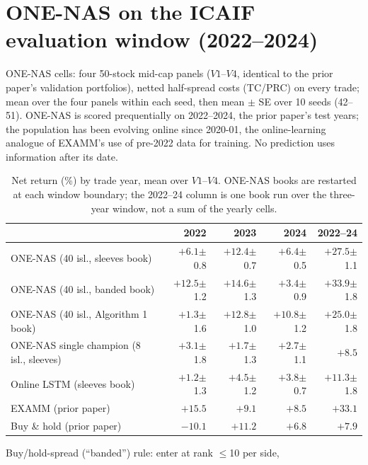 \documentclass[11pt]{article}
\newcommand{\se}[1]{{\scriptsize$\pm$#1}}
\begin{document}
\section*{ONE-NAS on the ICAIF evaluation window (2022--2024)}

ONE-NAS cells: four 50-stock mid-cap panels ($V1$--$V4$, identical to the
prior paper's validation portfolios), netted half-spread costs (TC/PRC) on
every trade; mean over the four panels within each seed, then mean $\pm$ SE
over 10 seeds (42--51). ONE-NAS is scored prequentially on 2022--2024, the
prior paper's test years; the population has been evolving online since
2020-01, the online-learning analogue of EXAMM's use of pre-2022 data for
training. No prediction uses information after its date.

\begin{table}[h]
\centering
\begin{threeparttable}
\caption{Net return (\%) by trade year, mean over $V1$--$V4$. ONE-NAS books
are restarted at each window boundary; the 2022--24 column is one book run
over the three-year window, not a sum of the yearly cells.}
\begin{tabular}{lrrrr}
\toprule
 & 2022 & 2023 & 2024 & 2022--24 \\
\midrule
ONE-NAS (40 isl., sleeves book)              & $+6.1$\se{0.8}  & $+12.4$\se{0.7} & $+6.4$\se{0.5}  & $+27.5$\se{1.1} \\
ONE-NAS (40 isl., banded book)\tnote{a}      & $+12.5$\se{1.2} & $+14.6$\se{1.3} & $+3.4$\se{0.9}  & $+33.9$\se{1.8} \\
ONE-NAS (40 isl., Algorithm 1 book)\tnote{b} & $+1.3$\se{1.6}  & $+12.8$\se{1.0} & $+10.8$\se{1.2} & $+25.0$\se{1.8} \\
\midrule
ONE-NAS single champion (8 isl., sleeves)\tnote{d} & $+3.1$\se{1.8} & $+1.7$\se{1.3} & $+2.7$\se{1.1} & $+8.5$ \\
Online LSTM (sleeves book)                   & $+1.2$\se{1.3}  & $+4.5$\se{1.2}  & $+3.8$\se{0.7}  & $+11.3$\se{1.8} \\
\midrule
EXAMM (prior paper)                          & $+15.5$         & $+9.1$          & $+8.5$          & $+33.1$\tnote{c} \\
Buy \& hold (prior paper)                    & $-10.1$         & $+11.2$         & $+6.8$          & $+7.9$\tnote{c} \\
\bottomrule
\end{tabular}
\begin{tablenotes}\footnotesize
\item[a] Buy/hold-spread (``banded'') rule: enter at rank $\le$10 per side,

\end{tablenotes}
\end{threeparttable}
\end{table}
\end{document}
